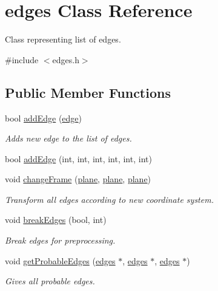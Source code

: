 \hypertarget{classedges}{}\section{edges Class Reference}
\label{classedges}


Class representing list of edges.  




{\ttfamily \#include $<$edges.\+h$>$}

\subsection*{Public Member Functions}
\begin{DoxyCompactItemize}
\item 
bool \mbox{\hyperlink{classedges_aa56e470241cdde31f4d4ac013c9e872e}{add\+Edge}} (\mbox{\hyperlink{structedge}{edge}})
\begin{DoxyCompactList}\small\item\em Adds new edge to the list of edges. \end{DoxyCompactList}\item 
bool \mbox{\hyperlink{classedges_a119439409099b29e22dc66cf279a0ac0}{add\+Edge}} (int, int, int, int, int, int)
\item 
void \mbox{\hyperlink{classedges_abd3214d701efbea5748b571d8ed4ae4f}{change\+Frame}} (\mbox{\hyperlink{structplane}{plane}}, \mbox{\hyperlink{structplane}{plane}}, \mbox{\hyperlink{structplane}{plane}})
\begin{DoxyCompactList}\small\item\em Transform all edges according to new coordinate system. \end{DoxyCompactList}\item 
void \mbox{\hyperlink{classedges_ae6ced63c681679ef31af8be2542a94b2}{break\+Edges}} (bool, int)
\begin{DoxyCompactList}\small\item\em Break edges for preprocessing. \end{DoxyCompactList}\item 
void \mbox{\hyperlink{classedges_a512e0c379fed7aae9c92fc059250c25c}{get\+Probable\+Edges}} (\mbox{\hyperlink{classedges}{edges}} $\ast$, \mbox{\hyperlink{classedges}{edges}} $\ast$, \mbox{\hyperlink{classedges}{edges}} $\ast$)
\begin{DoxyCompactList}\small\item\em Gives all probable edges. \end{DoxyCompactList}\item 

\end{DoxyCompactItemize}
